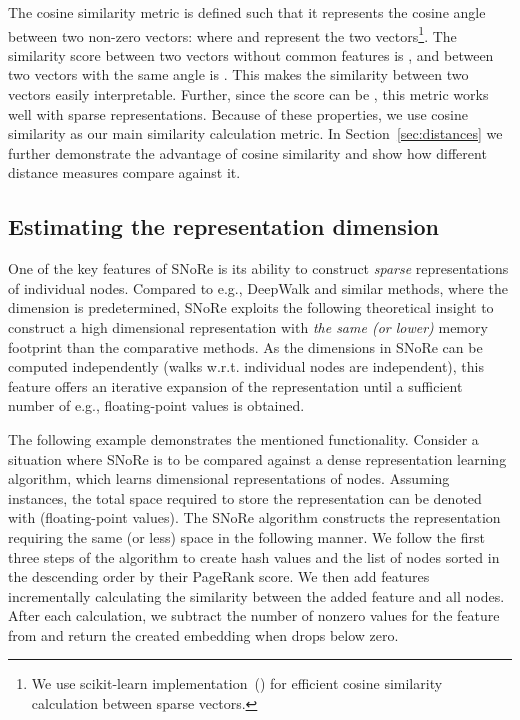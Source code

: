 \documentclass[twoside,11pt]{article}
\begin{document}
The cosine similarity metric is defined such that it represents the cosine angle between two non-zero vectors: 
where  and  represent the two vectors\footnote{We use scikit-learn implementation~(\cite{scikit-learn}) for efficient cosine similarity calculation between sparse vectors.}. The similarity score between two vectors without common features is , and between two vectors with the same angle is . This makes the similarity between two vectors easily interpretable. Further, since the score can be , this metric works well with sparse representations. Because of these properties, we use cosine similarity as our main similarity calculation metric.
In Section~\ref{sec:distances} we further demonstrate the advantage of cosine similarity and show how different distance measures compare against it.

\subsection{Estimating the representation dimension}
\label{sec:dim}
One of the key features of SNoRe is its ability to construct \emph{sparse} representations of individual nodes. Compared to e.g., DeepWalk and similar methods, where the dimension is predetermined, SNoRe exploits the following theoretical insight to construct a high dimensional representation with \emph{the same (or lower)} memory footprint than the comparative methods.
As the dimensions in SNoRe can be computed independently (walks w.r.t. individual nodes are independent), this feature offers an iterative expansion of the representation until a sufficient number of e.g., floating-point values is obtained.

The following example demonstrates the mentioned functionality. Consider a situation where SNoRe is to be compared against a dense representation learning algorithm, which learns  dimensional representations of nodes. Assuming  instances, the total space required to store the representation can be denoted with  (floating-point values). The SNoRe algorithm constructs the representation requiring the same (or less) space in the following manner.
We follow the first three steps of the algorithm to create hash values and the list of nodes sorted in the descending order by their PageRank score. We then add features incrementally calculating the similarity between the added feature and all nodes. After each calculation, we subtract the number of nonzero values for the feature from  and return the created embedding when  drops below zero.
\end{document}
